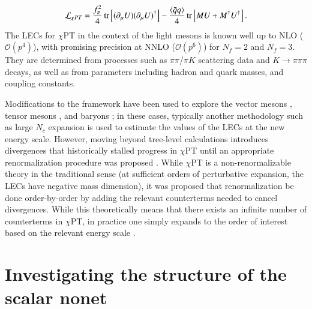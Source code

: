 \documentclass[aps,prd,onecolumn,showpacs,amsmath,amssymb,nofootinbib]{revtex4} \pdfoutput=1
\newcommand{\cpt}{$\chi$PT}
\begin{document}
\begin{equation}
    \label{cpt-Langrangian-LO}
    \mathcal{L}_{\chi PT} = \frac{f_{\pi}^{2}}{4} \tr \left[(\partial_{\mu} U)(\partial_{\mu} U)^{\dagger}\right]-\frac{\langle \bar{q}q\rangle}{4}\tr \left[MU + M^{\dagger}U^{\dagger} \right].
\end{equation}
The LECs for {\cpt} in the context of the light mesons is known well up to NLO ($\mathcal{O}\left(p^4\right)$), with promising precision at NNLO ($\mathcal{O}\left(p^6\right)$) \cite{Bijnens2014} for $N_f = 2$ and $N_f = 3$. They are determined from processes such as $\pi\pi$/$\pi K$ scattering data and $K\rightarrow \pi\pi\pi$ decays, as well as from parameters including hadron and quark masses, and coupling constants.

Modifications to the framework have been used to explore the vector mesons \cite{Bijnens1997}, tensor mesons \cite{Chow1998}, and baryons \cite{Bernard2008}; in these cases, typically another methodology such as large $N_c$ expansion is used to estimate the values of the LECs at the new energy scale. However, moving beyond tree-level calculations introduces divergences that historically stalled progress in {\cpt} until an appropriate renormalization procedure was proposed \cite{Gasser1984}. While {\cpt} is a non-renormalizable theory in the traditional sense (at sufficient orders of perturbative expansion, the LECs have negative mass dimension), it was proposed that renormalization be done order-by-order by adding the relevant counterterms needed to cancel divergences. While this theoretically means that there exists an infinite number of counterterms in {\cpt}, in practice one simply expands to the order of interest based on the relevant energy scale \cite{Gasser1984,Donoghue1992,Holstein2000}. 

\section{Investigating the structure of the scalar nonet}\label{V}
\end{document}
